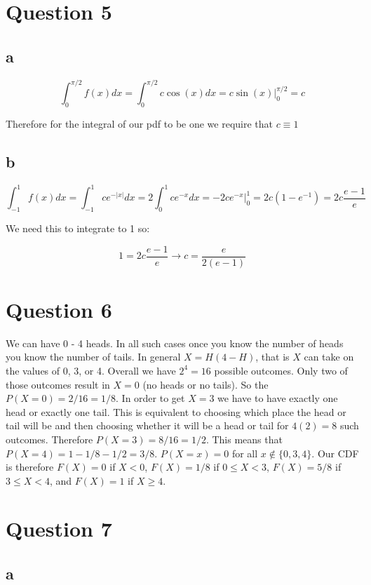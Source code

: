 \documentclass[11pt]{article}
\begin{document}
\section{Question 5}
\subsection{a}

$$\int_0^{\pi/2} f(x)dx = \int_0^{\pi/2} c \cos (x)dx=c \sin (x) \Big|_0^{\pi/2}=c$$

Therefore for the integral of our pdf to be one we require that $c\equiv 1$

\subsection{b}

$$\int_{-1}^{1} f(x)dx=\int_{-1}^{1} ce^{-|x|}dx=2\int_0^1 ce^{-x}dx=-2ce^{-x} \Big|_0^{1}=2c(1-e^{-1})=2c\frac{e-1}{e}$$

We need this to integrate to 1 so:

$$1=2c\frac{e-1}{e}\rightarrow c=\frac{e}{2(e-1)}$$

\section{Question 6}

We can have 0 - 4 heads. In all such cases once you know the number of heads you know the number of tails. In general $X=H(4-H)$, that is $X$ can take on the values of 0, 3, or 4. Overall we have $2^4=16$ possible outcomes. Only two of those outcomes result in $X=0$ (no heads or no tails). So the $P(X=0)=2/16=1/8$. In order to get $X=3$ we have to have exactly one head or exactly one tail. This is equivalent to choosing which place the head or tail will be and then choosing whether it will be a head or tail for $4(2)=8$ such outcomes. Therefore $P(X=3)=8/16=1/2$. This means that $P(X=4)=1-1/8-1/2=3/8$. $P(X=x)=0$ for all $x\notin \{0, 3, 4\}$. Our CDF is therefore $F(X) = 0$ if $X<0$, $F(X) = 1/8$ if $0\leq X<3$, $F(X) = 5/8$ if $3\leq X<4$, and $F(X) = 1$ if $X\geq 4$.

\section{Question 7}

\subsection{a}
\end{document}
